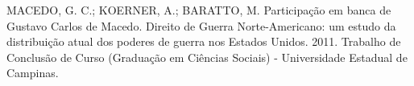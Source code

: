 

\begin{cvcitems}
  \cvcitem
    {MACEDO, G. C.; KOERNER, A.; BARATTO, M.}
    {Participação em banca de Gustavo Carlos de Macedo. Direito de Guerra Norte-Americano: um estudo da distribuição atual dos poderes de guerra nos Estados Unidos. 2011. Trabalho de Conclusão de Curso (Graduação em Ciências Sociais) - Universidade Estadual de Campinas.}
\end{cvcitems}
